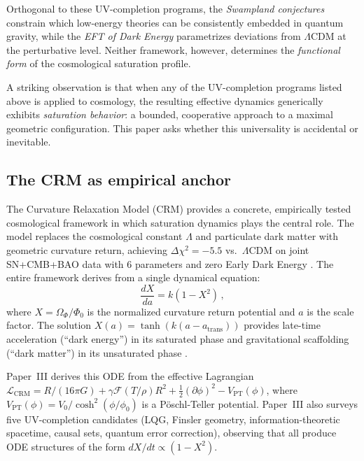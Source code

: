 \documentclass[aps,prd,twocolumn,superscriptaddress,nofootinbib]{revtex4-2}
\begin{document}
Orthogonal to these UV-completion programs, the \textit{Swampland conjectures} \cite{Obied2018} constrain which low-energy theories can be consistently embedded in quantum gravity, while the \textit{EFT of Dark Energy} \cite{Gubitosi2013} parametrizes deviations from $\Lambda$CDM at the perturbative level. Neither framework, however, determines the \textit{functional form} of the cosmological saturation profile.

A striking observation is that when any of the UV-completion programs listed above is applied to cosmology, the resulting effective dynamics generically exhibits \textit{saturation behavior}: a bounded, cooperative approach to a maximal geometric configuration. This paper asks whether this universality is accidental or inevitable.

\subsection{The CRM as empirical anchor}

The Curvature Relaxation Model (CRM) \cite{Geiger2026,Geiger2026b,Geiger2026c,Geiger2026d} provides a concrete, empirically tested cosmological framework in which saturation dynamics plays the central role. The model replaces the cosmological constant $\Lambda$ and particulate dark matter with geometric curvature return, achieving $\Delta\chi^2 = -5.5$ vs.\ $\Lambda$CDM on joint SN+CMB+BAO data with 6 parameters and zero Early Dark Energy \cite{Geiger2026b}. The entire framework derives from a single dynamical equation:
\begin{equation}
\frac{dX}{da} = k(1 - X^2)\,,
\label{eq:saturation_ode}
\end{equation}
where $X = \Omega_\Phi/\Phi_0$ is the normalized curvature return potential and $a$ is the scale factor. The solution $X(a) = \tanh(k(a - a_{\mathrm{trans}}))$ provides late-time acceleration (``dark energy'') in its saturated phase and gravitational scaffolding (``dark matter'') in its unsaturated phase \cite{Geiger2026b}.

Paper~III \cite{Geiger2026c} derives this ODE from the effective Lagrangian $\mathcal{L}_{\mathrm{CRM}} = R/(16\pi G) + \gamma \mathcal{F}(T/\rho) R^2 + \frac{1}{2}(\partial\phi)^2 - V_{\mathrm{PT}}(\phi)$, where $V_{\mathrm{PT}}(\phi) = V_0/\cosh^2(\phi/\phi_0)$ is a P\"oschl-Teller potential. Paper~III also surveys five UV-completion candidates (LQG, Finsler geometry, information-theoretic spacetime, causal sets, quantum error correction), observing that all produce ODE structures of the form $dX/dt \propto (1 - X^2)$.
\end{document}
